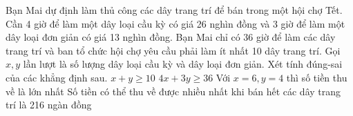 \begin{ex}
 Bạn Mai dự định làm thủ công các dây trang trí để bán trong một hội chợ Tết. Cần 4 giờ để làm một dây loại cầu kỳ có giá 26 nghìn đồng và 3 giờ để làm một dây loại đơn giản có giá 13 nghìn đồng. Bạn Mai chỉ có 36 giờ để làm các dây trang trí và ban tổ chức hội chợ yêu cầu phải làm ít nhất 10 dây trang trí. Gọi ${x,y}$ lần lượt là số lượng dây loại cầu kỳ và dây loại đơn giản. Xét tính đúng-sai của các khẳng định sau. 
\choiceTFt
{ \True  $x+y \ge 10$ }
   {  $4x+3y \ge 36$ }
     { \True  Với $x = 6, y = 4$ thì số tiền thu về là lớn nhất }
    { Số tiền có thể thu về được nhiều nhất khi bán hết các dây trang trí là 216 ngàn đồng }
\end{ex}

